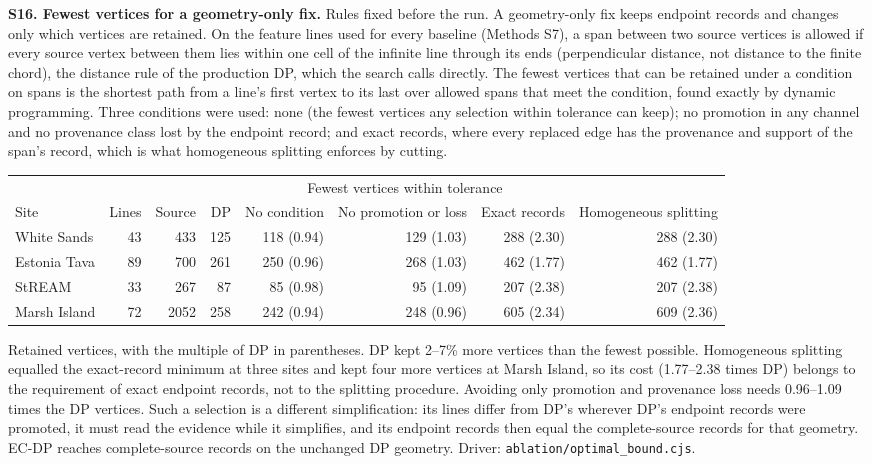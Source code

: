 \documentclass[11pt]{article}
\begin{document}
\vspace{4mm}
\noindent\textbf{S16. Fewest vertices for a geometry-only fix.} Rules fixed before the run. A geometry-only fix keeps endpoint records and changes only which vertices are retained. On the feature lines used for every baseline (Methods S7), a span between two source vertices is allowed if every source vertex between them lies within one cell of the infinite line through its ends (perpendicular distance, not distance to the finite chord), the distance rule of the production DP, which the search calls directly. The fewest vertices that can be retained under a condition on spans is the shortest path from a line's first vertex to its last over allowed spans that meet the condition, found exactly by dynamic programming. Three conditions were used: none (the fewest vertices any selection within tolerance can keep); no promotion in any channel and no provenance class lost by the endpoint record; and exact records, where every replaced edge has the provenance and support of the span's record, which is what homogeneous splitting enforces by cutting.

\begin{center}\scriptsize
\begin{tabular}{@{}lrrrrrrr@{}}
\toprule
 & & & & \multicolumn{3}{c}{Fewest vertices within tolerance} & \\
\cmidrule(lr){5-7}
Site & Lines & Source & DP & No condition & No promotion or loss & Exact records & Homogeneous splitting \\
\midrule
White Sands & 43 & 433 & 125 & 118 (0.94) & 129 (1.03) & 288 (2.30) & 288 (2.30) \\
Estonia Tava & 89 & 700 & 261 & 250 (0.96) & 268 (1.03) & 462 (1.77) & 462 (1.77) \\
StREAM & 33 & 267 & 87 & 85 (0.98) & 95 (1.09) & 207 (2.38) & 207 (2.38) \\
Marsh Island & 72 & 2052 & 258 & 242 (0.94) & 248 (0.96) & 605 (2.34) & 609 (2.36) \\
\bottomrule
\end{tabular}
\end{center}

\noindent Retained vertices, with the multiple of DP in parentheses. DP kept 2--7\% more vertices than the fewest possible. Homogeneous splitting equalled the exact-record minimum at three sites and kept four more vertices at Marsh Island, so its cost (1.77--2.38 times DP) belongs to the requirement of exact endpoint records, not to the splitting procedure. Avoiding only promotion and provenance loss needs 0.96--1.09 times the DP vertices. Such a selection is a different simplification: its lines differ from DP's wherever DP's endpoint records were promoted, it must read the evidence while it simplifies, and its endpoint records then equal the complete-source records for that geometry. EC-DP reaches complete-source records on the unchanged DP geometry. Driver: \texttt{ablation/optimal\_bound.cjs}.
\end{document}
